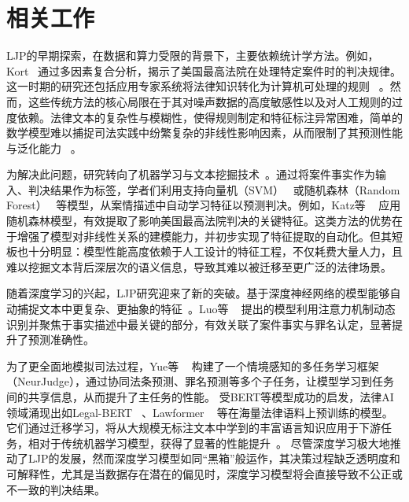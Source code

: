 \section{\heiti 相关工作}
LJP的早期探索，在数据和算力受限的背景下，主要依赖统计学方法。例如，Kort~\cite{kort1957predicting} 通过多因素复合分析，揭示了美国最高法院在处理特定案件时的判决规律。这一时期的研究还包括应用专家系统将法律知识转化为计算机可处理的规则 ~\cite{susskind1986expert}。然而，这些传统方法的核心局限在于其对噪声数据的高度敏感性以及对人工规则的过度依赖。法律文本的复杂性与模糊性，使得规则制定和特征标注异常困难，简单的数学模型难以捕捉司法实践中纷繁复杂的非线性影响因素，从而限制了其预测性能与泛化能力 ~\cite{deng2023syllogistic}。

为解决此问题，研究转向了机器学习与文本挖掘技术~\cite{chen2013text,goncalves2005evaluating}。通过将案件事实作为输入、判决结果作为标签，学者们利用支持向量机（SVM）~\cite{kianmehr2006crime} 或随机森林（Random Forest） ~\cite{sulea2017exploring}等模型，从案情描述中自动学习特征以预测判决。例如，Katz等 ~\cite{sulea2017exploring} 应用随机森林模型，有效提取了影响美国最高法院判决的关键特征。这类方法的优势在于增强了模型对非线性关系的建模能力，并初步实现了特征提取的自动化。但其短板也十分明显：模型性能高度依赖于人工设计的特征工程，不仅耗费大量人力，且难以挖掘文本背后深层次的语义信息，导致其难以被迁移至更广泛的法律场景。

随着深度学习的兴起，LJP研究迎来了新的突破。基于深度神经网络的模型能够自动捕捉文本中更复杂、更抽象的特征~\cite{cheng2025legal,dong2021legal,feng2022legal,jiang2018interpretable,wang2019hierarchical}。Luo等 ~\cite{huang2019improved} 提出的模型利用注意力机制动态识别并聚焦于事实描述中最关键的部分，有效关联了案件事实与罪名认定，显著提升了预测准确性。

为了更全面地模拟司法过程，Yue等 ~\cite{yue2021neurjudge} 构建了一个情境感知的多任务学习框架（NeurJudge），通过协同法条预测、罪名预测等多个子任务，让模型学习到任务间的共享信息，从而提升了主任务的性能。
受BERT等模型成功的启发，法律AI领域涌现出如Legal-BERT ~\cite{liu2021robustly,chalkidis2020legal,deepa2021bidirectional,devlin2019bert,fan2022multi}、Lawformer ~\cite{xiao2021lawformer,du2022glm,fei2023lawbench,oana-maria2018e-snli} 等在海量法律语料上预训练的模型。它们通过迁移学习，将从大规模无标注文本中学到的丰富语言知识应用于下游任务，相对于传统机器学习模型，获得了显著的性能提升~\cite{cui2021pre,houlsby2019parameter,hu2018few,zhang2023contrastive}。
尽管深度学习极大地推动了LJP的发展，然而深度学习模型如同“黑箱”般运作，其决策过程缺乏透明度和可解释性，尤其是当数据存在潜在的偏见时，深度学习模型将会直接导致不公正或不一致的判决结果。

